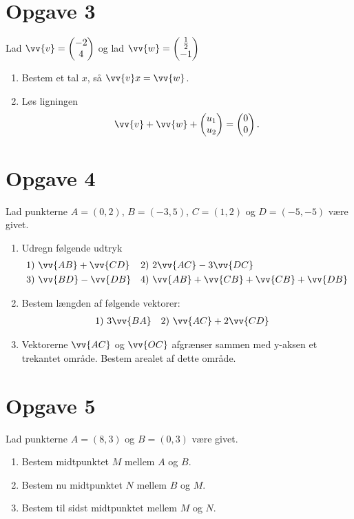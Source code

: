 \section*{Opgave 3}
Lad $\vv{v} = \begin{pmatrix} -2 \\ 4\end{pmatrix}$ og lad $\vv{w} = \begin{pmatrix}\frac{1}{2} \\ -1\end{pmatrix}$
\begin{enumerate}[label=\roman*)]
\item Bestem et tal $x$, så $\vv{v}x = \vv{w}$.
\item Løs ligningen
\begin{align*}
\vv{v} + \vv{w} + \begin{pmatrix}u_1 \\ u_2\end{pmatrix} = \begin{pmatrix}0 \\ 0\end{pmatrix}.
\end{align*}
\end{enumerate}

\section*{Opgave 4}
Lad punkterne $A = (0,2)$, $B = (-3,5)$, $C = (1,2)$ og $D = (-5,-5)$ være givet.
\begin{enumerate}[label=\roman*)]
\item Udregn følgende udtryk
\begin{align*}
&1) \ \vv{AB} + \vv{CD}   &&2) \  2\vv{AC} - 3\vv{DC}   \\
&3) \ \vv{BD} - \vv{DB}  &&4) \ \vv{AB} + \vv{CB} + \vv{CB} + \vv{DB}   \\
\end{align*}
\item Bestem længden af følgende vektorer:
\begin{align*}
&1) \ 3\vv{BA}   &&2) \  \vv{AC} + 2\vv{CD} 
\end{align*}
\item Vektorerne $\vv{AC}$ og $\vv{OC}$ afgrænser sammen med y-aksen et trekantet område. Bestem arealet af dette område.
\end{enumerate}
\section*{Opgave 5}
Lad punkterne $A = (8,3)$ og $B = (0,3)$ være givet. 
\begin{enumerate}[label=\roman*)]
\item Bestem midtpunktet $M$ mellem $A$ og $B$. 
\item Bestem nu midtpunktet $N$ mellem $B$ og $M$.
\item Bestem til sidst midtpunktet mellem $M$ og $N$.
\end{enumerate}

